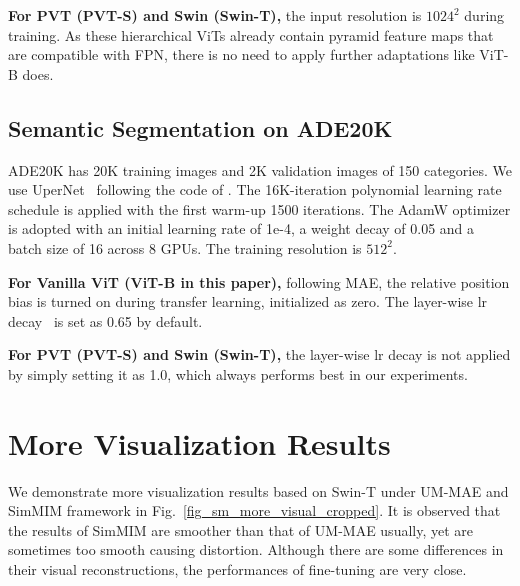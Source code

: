 \documentclass{article}
\begin{document}
\textbf{For PVT (PVT-S) and Swin (Swin-T),} the input resolution is $1024^2$ during training. As these hierarchical ViTs already contain pyramid feature maps that are compatible with FPN, there is no need to apply further adaptations like ViT-B does. 




\subsection{Semantic Segmentation on ADE20K}
ADE20K has 20K training images and 2K validation images of 150 categories. We use UperNet~\cite{xiao2018unified} following the code of \cite{bao2021beit}. The 16K-iteration polynomial learning rate schedule is applied with the first warm-up 1500 iterations. The AdamW optimizer is adopted with an initial learning rate of 1e-4, a weight decay of 0.05 and a batch size of 16 across 8 GPUs. The training resolution is $512^2$.

\textbf{For Vanilla ViT (ViT-B in this paper),} following MAE, the relative position bias is turned on during transfer learning, initialized as zero. The layer-wise lr decay~\cite{clark2020electra,bao2021beit} is set as 0.65 by default.

\textbf{For PVT (PVT-S) and Swin (Swin-T),} the layer-wise lr decay is not applied by simply setting it as 1.0, which always performs best in our experiments. 






\section{More Visualization Results}
We demonstrate more visualization results based on Swin-T under UM-MAE and SimMIM framework in Fig.~\ref{fig_sm_more_visual_cropped}. It is observed that the results of SimMIM are smoother than that of UM-MAE usually, yet are sometimes too smooth causing distortion. Although there are some differences in their visual reconstructions, the performances of fine-tuning are very close.
\end{document}
